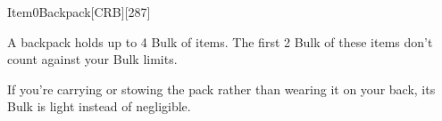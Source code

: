 
\begin{card}{Item}{0}{Backpack}[CRB][287]

A backpack holds up to 4 Bulk of items. 
The first 2 Bulk of these items don't count against your Bulk limits. 

If you're carrying or stowing the pack rather than wearing it on your back, its Bulk is light instead of negligible.


\vfill

\ItemPrice{1sp}
\ItemBulk{-}
\end{card}
